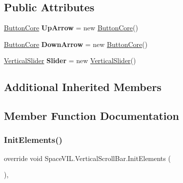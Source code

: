 \subsection*{Public Attributes}
\begin{DoxyCompactItemize}
\item 
\mbox{\label{class_space_v_i_l_1_1_vertical_scroll_bar_a83fe7120eb5047a19e4e422e072ff65f}} 
\mbox{\hyperlink{class_space_v_i_l_1_1_button_core}{Button\+Core}} {\bfseries Up\+Arrow} = new \mbox{\hyperlink{class_space_v_i_l_1_1_button_core}{Button\+Core}}()
\item 
\mbox{\label{class_space_v_i_l_1_1_vertical_scroll_bar_a55ebd1c124eb7ba6c742d08cdd2da0c8}} 
\mbox{\hyperlink{class_space_v_i_l_1_1_button_core}{Button\+Core}} {\bfseries Down\+Arrow} = new \mbox{\hyperlink{class_space_v_i_l_1_1_button_core}{Button\+Core}}()
\item 
\mbox{\label{class_space_v_i_l_1_1_vertical_scroll_bar_a1f3346f0d85f08b75d6a05dba3e58e7b}} 
\mbox{\hyperlink{class_space_v_i_l_1_1_vertical_slider}{Vertical\+Slider}} {\bfseries Slider} = new \mbox{\hyperlink{class_space_v_i_l_1_1_vertical_slider}{Vertical\+Slider}}()
\end{DoxyCompactItemize}
\subsection*{Additional Inherited Members}


\subsection{Member Function Documentation}
\mbox{\label{class_space_v_i_l_1_1_vertical_scroll_bar_aa74f074945d0b53b3a2dc0eb97904ce1}} 
\subsubsection{\texorpdfstring{Init\+Elements()}{InitElements()}}
{\footnotesize\ttfamily override void Space\+V\+I\+L.\+Vertical\+Scroll\+Bar.\+Init\+Elements (\begin{DoxyParamCaption}{ }\end{DoxyParamCaption})\hspace{0.3cm}{\ttfamily [inline]}, {\ttfamily [virtual]}}



